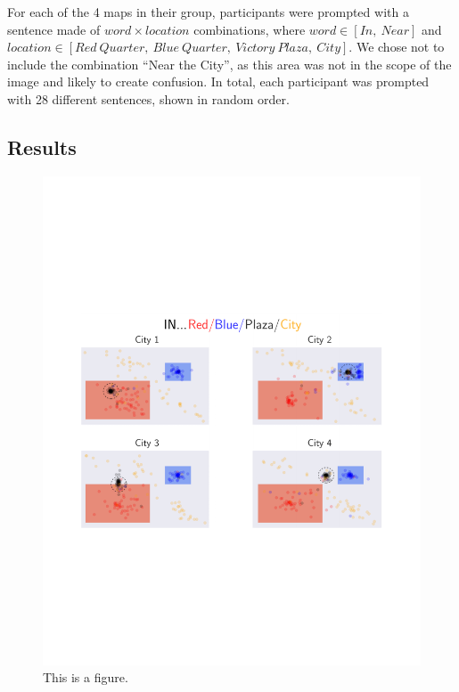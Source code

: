 \documentclass[10pt,letterpaper]{article}
\begin{document}
For each of the 4 maps in their group, participants were prompted with a sentence made of $word \times location$ combinations, where $word \in [In,\ Near]$ and $location \in [Red\ Quarter,\ Blue\ Quarter,\ Victory\ Plaza,\ City]$. We chose not to include the combination ``Near the City'', as this area was not in the scope of the image and likely to create confusion. In total, each participant was prompted with 28 different sentences, shown in random order. 

\subsection{Results} 

\begin{figure}[t]
\begin{center}
\includegraphics[width=\textwidth]{figures/In.pdf}
\end{center}
\caption{This is a figure.} 
\label{sample-figure}
\end{figure}
\end{document}
